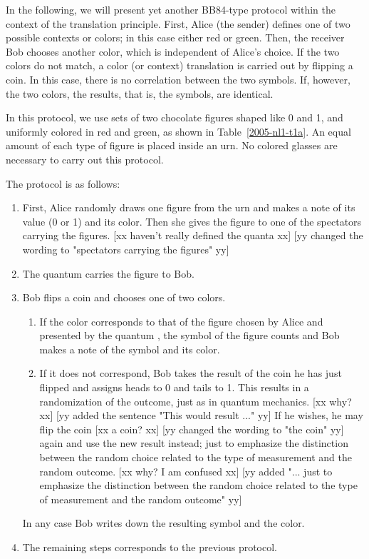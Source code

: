 \documentclass[prb,amssymb,preprint]{revtex4}
\begin{document}
In the following, we will present yet another BB84-type protocol
within the context of the translation principle.\cite{svozil-2003-garda}
First, Alice (the sender) defines one of two possible contexts or
colors; in this case either red or green.
Then, the receiver Bob chooses another color, which is independent of Alice's
choice. If the two colors do not match, a color (or context\cite{svozil-2003-garda})
translation
is carried out by flipping a coin. In this case, there is
no correlation between the two symbols. If, however, the two colors, the
results, that is, the symbols, are identical.

In this protocol, we use sets of two chocolate figures shaped like 0 and 1,
and uniformly colored in red and green, as shown in
Table~\ref{2005-nl1-t1a}. An equal amount of each type of figure is placed
inside an urn. No colored glasses are necessary to carry out this protocol.

The protocol is as follows:

\begin{enumerate}

\item First, Alice randomly draws one figure from the urn and makes a
note of its value (0 or 1) and its color. Then she gives the figure to one
of the spectators carrying the figures.
[xx haven't really defined the quanta xx]
[yy changed the wording to "spectators carrying the figures" yy]

\item
The quantum carries the figure to Bob.

\item
Bob flips a coin and chooses one of two colors.

\begin{enumerate}

\item If the color corresponds to that of the figure chosen by Alice and
presented by the quantum ,
the symbol of the figure counts and Bob makes a note of the symbol and its
color.

\item If it does not correspond, Bob takes the result of the coin he has
just flipped and assigns heads to 0 and tails to 1.
This results in a randomization of the outcome, just as in quantum mechanics.
[xx why? xx]
[yy added the sentence "This would result ..." yy]
If he
wishes, he may flip the coin
[xx a coin? xx]
[yy changed the wording to "the coin" yy]
again and use the new result
instead; just to emphasize the distinction between the random choice related to the
type of measurement and  the random outcome.
[xx why? I am confused xx]
[yy added "... just to emphasize the distinction between the random choice related to the
type of measurement and  the random outcome" yy]

\end{enumerate}
In any case Bob writes down the resulting symbol and the color.

\item The remaining steps corresponds to the previous protocol.

\end{enumerate}
\end{document}
